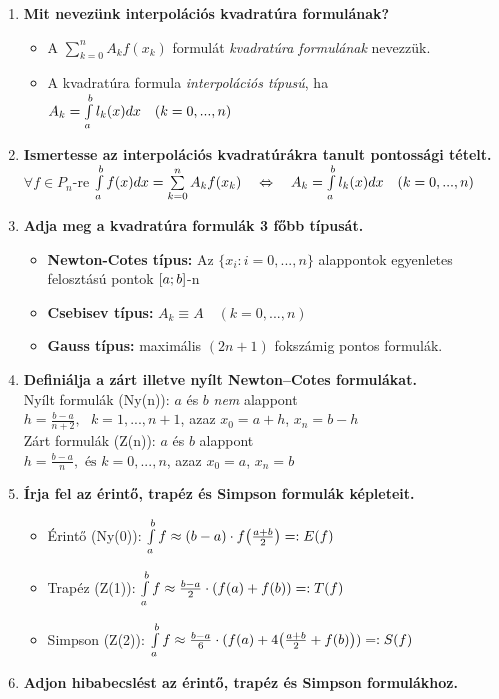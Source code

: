 \documentclass{article}
\begin{document}
\begin{enumerate}
	\newpage
	\item\textbf{Mit nevezünk interpolációs kvadratúra formulának?}
	\begin{itemize}
		\item A $\sum\limits_{k=0}^{n}A_kf(x_k)$ formulát \textit{kvadratúra formulának} nevezzük.
		\item A kvadratúra formula \textit{interpolációs típusú}, ha
		$A_k=\int\limits_{a}^{b} l_k(x)dx\quad(k=0,...,n)$
	\end{itemize}
	\item\textbf{Ismertesse az interpolációs kvadratúrákra tanult pontossági tételt.}\\[0.1cm]
	$\forall f\in P_n$-re $\int\limits_{a}^{b} f(x)dx=\sum\limits_{k=0}^{n}A_kf(x_k)\quad\Leftrightarrow
	\quad A_k=\int\limits_{a}^{b} l_k(x)dx\quad(k=0,...,n)$
	\item\textbf{Adja meg a kvadratúra formulák 3 főbb típusát.}
	\begin{itemize}
		\item\textbf{Newton-Cotes típus:} Az $\{x_i:i=0,...,n\}$ alappontok egyenletes
		felosztású pontok $[a;b]$-n
		\item\textbf{Csebisev típus:} $A_k\equiv A\quad(k=0,...,n)$
		\item\textbf{Gauss típus:} maximális $(2n+1)$ fokszámig pontos formulák.
	\end{itemize}
	\item\textbf{Definiálja a zárt illetve nyílt Newton–Cotes formulákat.}\\[0.1cm]
	Nyílt formulák (Ny(n)): $a$ és $b$ \textit{nem} alappont\\[0.1cm]
	$h=\frac{b-a}{n+2},\text{  }k=1,...,n+1$, azaz $x_0=a+h$, $x_n=b-h$\\[0.2cm]
	Zárt formulák (Z(n)): $a$ és $b$ alappont\\[0.1cm]
	$h=\frac{b-a}{n},\text{ és }k=0,...,n$, azaz $x_0=a$, $x_n=b$
	\item\textbf{Írja fel az érintő, trapéz és Simpson formulák képleteit.}
	\begin{itemize}
		\item Érintő (Ny(0)): $\int\limits_{a}^{b} f\approx(b-a)\cdot f\big(\frac{a+b}{2}\big)=:E(f)$
		\item Trapéz (Z(1)): $\int\limits_{a}^{b} f\approx\frac{b-a}{2}\cdot(f(a)+f(b))=:T(f)$
		\item Simpson (Z(2)): $\int\limits_{a}^{b} f\approx\frac{b-a}{6}\cdot(f(a)+4\big(
		\frac{a+b}{2}+f(b)\big))=:S(f)$
	\end{itemize}
	\item\textbf{Adjon hibabecslést az érintő, trapéz és Simpson formulákhoz.}

\end{enumerate}
\end{document}
